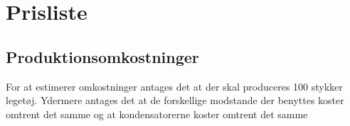 \section{Prisliste}
\subsection{Produktionsomkostninger}



% 






For at estimerer omkostninger antages det at der skal produceres 100 stykker legetøj. Ydermere antages det at de forskellige modstande der benyttes koster omtrent det samme og at kondensatorerne koster omtrent det samme 


